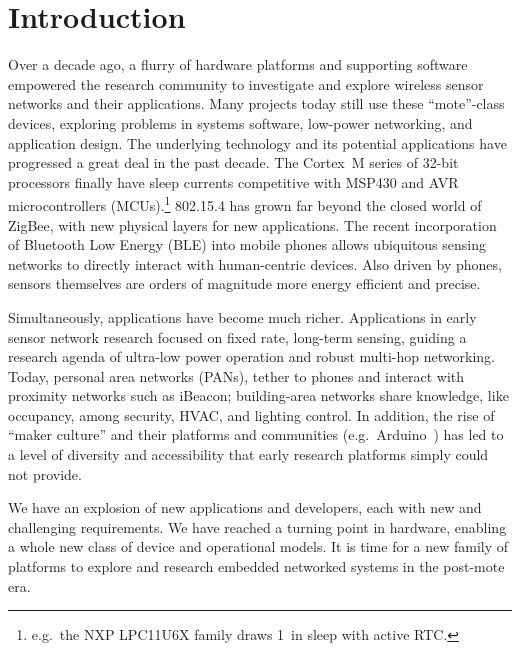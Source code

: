 \section{Introduction}
\label{sec:intro}

Over a decade ago, a flurry of hardware platforms and supporting software
empowered the research community to investigate and explore wireless sensor
networks and their applications. Many projects today still use these
``mote''-class devices, exploring problems in systems software, low-power
networking, and application design.
%
The underlying technology and its potential applications have progressed a
great deal in the past decade. The Cortex~M series of 32-bit processors
finally have sleep currents competitive with MSP430 and AVR microcontrollers
(MCUs).\footnote{
  e.g.\ the NXP LPC11U6X family draws 1~\uA in sleep with active RTC.
}
802.15.4 has grown far beyond the closed world of ZigBee, with
new physical layers for new applications. The recent incorporation of
Bluetooth Low Energy (BLE) into mobile phones allows ubiquitous sensing networks to
directly interact with human-centric devices. Also driven by phones, sensors
themselves are orders of magnitude more energy efficient and precise.

Simultaneously, applications have become much richer. Applications in early
sensor network research focused on fixed rate, long-term sensing, guiding a
research agenda of ultra-low power operation and robust multi-hop networking.
Today, personal area networks (PANs), tether to phones and interact with
proximity networks such as iBeacon; building-area networks share knowledge, like
occupancy, among security, HVAC, and lighting control.
In addition, the rise of ``maker culture'' and their platforms and communities
(e.g.\ Arduino~\cite{arduino}) has led to a level of diversity and
accessibility that early research platforms simply could not provide.

We have an explosion of new applications and developers, each with new and challenging
requirements. We have reached a turning point in hardware, enabling a whole
new class of device and operational models. It is time for a new family of
platforms to explore and research embedded networked systems in the post-mote
era.

